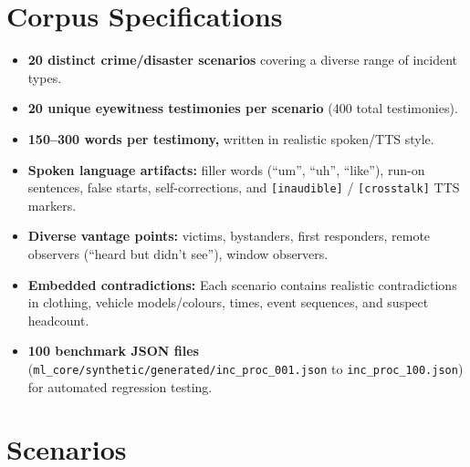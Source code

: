 \documentclass[12pt,a4paper]{report}
\begin{document}
\section{Corpus Specifications}

\begin{itemize}[leftmargin=2cm]
    \item \textbf{20 distinct crime/disaster scenarios} covering a diverse range of incident types.
    \item \textbf{20 unique eyewitness testimonies per scenario} (400 total testimonies).
    \item \textbf{150--300 words per testimony,} written in realistic spoken/TTS style.
    \item \textbf{Spoken language artifacts:} filler words (``um'', ``uh'', ``like''), run-on sentences, false starts, self-corrections, and \texttt{[inaudible]} / \texttt{[crosstalk]} TTS markers.
    \item \textbf{Diverse vantage points:} victims, bystanders, first responders, remote observers (``heard but didn't see''), window observers.
    \item \textbf{Embedded contradictions:} Each scenario contains realistic contradictions in clothing, vehicle models/colours, times, event sequences, and suspect headcount.
    \item \textbf{100 benchmark JSON files} (\texttt{ml\_core/synthetic/generated/inc\_proc\_001.json} to \texttt{inc\_proc\_100.json}) for automated regression testing.
\end{itemize}

\section{Scenarios}
\end{document}
